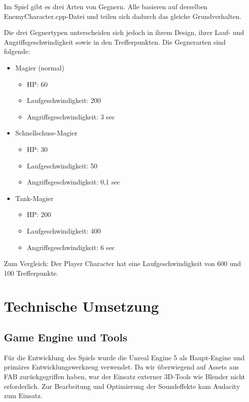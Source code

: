 \documentclass[oneside]{ausarbeitung}
\begin{document}
Im Spiel gibt es drei Arten von Gegnern. Alle basieren auf derselben EnemyCharacter.cpp-Datei und teilen sich dadurch das gleiche Grundverhalten.

Die drei Gegnertypen unterscheiden sich jedoch in ihrem Design, ihrer Lauf- und Angriffsgeschwindigkeit sowie in den Trefferpunkten.
Die Gegnerarten sind folgende:

  \begin{itemize}
    \item Magier (normal)
        \begin{itemize}
            \item HP: 60
            \item Laufgeschwindigkeit: 200
            \item Angriffsgeschwindigkeit: 3 sec
        \end{itemize}
    \item Schnellschuss-Magier
            \begin{itemize}
            \item HP: 30
            \item Laufgeschwindigkeit: 50
            \item Angriffsgeschwindigkeit: 0,1 sec
        \end{itemize}
    \item Tank-Magier
            \begin{itemize}
            \item HP: 200
            \item Laufgeschwindigkeit: 400
            \item Angriffsgeschwindigkeit: 6 sec
        \end{itemize}
  \end{itemize}

Zum Vergleich: Der Player Character hat eine Laufgeschwindigkeit von 600 und 100 Trefferpunkte. 

\chapter{Technische Umsetzung}
\label{cha:technischeumsetzung}

\section{Game Engine und Tools}
\label{sec:gameengineundtools}

Für die Entwicklung des Spiels wurde die Unreal Engine 5 als Haupt-Engine und primäres Entwicklungswerkzeug verwendet. 
Da wir überwiegend auf Assets aus FAB zurückgegriffen haben, war der Einsatz externer 3D-Tools wie Blender nicht erforderlich. 
Zur Bearbeitung und Optimierung der Soundeffekte kam Audacity zum Einsatz.
\end{document}
